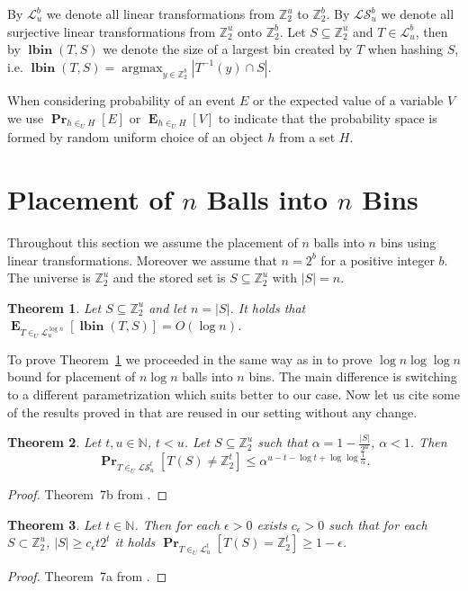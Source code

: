 \documentclass{article}
\newcommand{\lbin}[2]{\operatorname{\mathbf{lbin}}({#1}, {#2})}
\newcommand{\vecspace}[2]{\mathbb{Z}_{#1}^{#2}}
\newcommand{\binvecspace}[1]{\vecspace{2}{#1}}
\newcommand{\linearmaps}[2]{\mathcal{L}_{#1}^{#2}}
\newcommand{\surjectivelinearmaps}[2]{\mathcal{LS}_{#1}^{#2}}
\newcommand{\probs}[2]{\operatorname{\mathbf{Pr}}_{{#1}}\left[{#2}\right]}
\newcommand{\expects}[2]{\operatorname{\mathbf{E}}_{{#1}}\left[{#2}\right]}
\newtheorem{theorem}{Theorem}
\begin{document}
By $\linearmaps{u}{b}$ we denote all linear transformations from $\binvecspace{u}$ to $\binvecspace{b}$.
By $\surjectivelinearmaps{u}{b}$ we denote all surjective linear transformations from $\binvecspace{u}$ onto $\binvecspace{b}$.
Let $S \subseteq \binvecspace{u}$ and $T \in \linearmaps{u}{b}$, then by $\lbin{T}{S}$ we denote the size of a largest bin created by $T$ when hashing $S$, i.e. $\lbin{T}{S} = \operatorname{argmax}_{y \in \binvecspace{b}} |T^{-1}(y) \cap S|$.

When considering probability of an event $E$ or the expected value of a variable $V$ we use $\probs{h \in_U H}{E}$ or $\expects{h \in_U H}{V}$ to indicate that the probability space is formed by random uniform choice of an object $h$ from a set $H$.

\section{Placement of $n$ Balls into $n$ Bins}

Throughout this section we assume the placement of $n$ balls into $n$ bins using linear transformations.
Moreover we assume that $n = 2^b$ for a positive integer $b$.
The universe is $\binvecspace{u}$ and the stored set is $S \subseteq \binvecspace{u}$ with $|S| = n$.
\begin{theorem}
\label{theorem-n-to-n}
Let $S \subseteq \binvecspace{u}$ and let $n = |S|$. It holds that $\expects{T \in_U \linearmaps{u}{\log n}}{\lbin{T}{S}} = O(\log n)$.
\end{theorem}
To prove Theorem~\ref{theorem-n-to-n} we proceeded in the same way as in \cite{alonetal} to prove $\log n \log \log n$ bound for placement of $n \log n$ balls into $n$ bins.
The main difference is switching to a different parametrization which suits better to our case.
Now let us cite some of the results proved in \cite{alonetal} that are reused in our setting without any change.
\begin{theorem}
\label{theorem-prob-bound}
Let $t, u \in \mathbb{N}$, $t < u$.
Let $S \subseteq \binvecspace{u}$ such that $\alpha = 1 - \frac{|S|}{2^u}$, $\alpha < 1$.
Then 
\[
\probs{T \in_U \surjectivelinearmaps{u}{t}}{T(S) \neq \binvecspace{t}} \leq \alpha^{u - t - \log t + \log \log \frac{1}{\alpha}}.
\]
\end{theorem}
\begin{proof}
Theorem~{7b} from \cite{alonetal}.
\end{proof}

\begin{theorem}
\label{theorem-epsilon}
Let $t \in \mathbb{N}$.
Then for each $\epsilon > 0$ exists $c_\epsilon > 0$ such that for each $S \subset \binvecspace{u}$, $|S| \geq c_\epsilon t 2^t$ it holds  $\probs{T \in_U \linearmaps{u}{t}}{T(S) = \binvecspace{t}} \geq 1 - \epsilon$.
\end{theorem}
\begin{proof}
Theorem~{7a} from \cite{alonetal}.
\end{proof}
\end{document}
